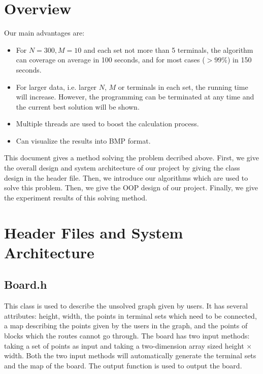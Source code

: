 \documentclass[12pt, a4paper]{article}
\begin{document}
	\section{Overview}
	
		Our main advantages are:
		
		\begin{itemize}
		
		\item For $N = 300, M = 10$ and each set not more than 5 terminals, the algorithm can coverage on average in 100 seconds, and for most cases ($> 99\%$) in 150 seconds.
		
		\item For larger data, i.e. larger $N$, $M$ or terminals in each set, the running time will increase. However, the programming can be terminated at any time and the current best solution will be shown.
		
		\item Multiple threads are used to boost the calculation process.
		
		\item Can visualize the results into BMP format.
		
		\end{itemize}
	
		This document gives a method solving the problem decribed above. First, we give the overall design and system architecture of our project by giving the class design in the header file. Then, we introduce our algorithms which are used to solve this problem. Then, we give the OOP design of our project. Finally, we give the experiment results of this solving method.
	
	\section{Header Files and System Architecture}
	
		\subsection{Board.h}
		
			This class is used to describe the unsolved graph given by users. It has several attributes: height, width, the points in terminal sets which need to be connected, a map describing the points given by the users in the graph, and the points of blocks which the routes cannot go through. The board has two input methods: taking a set of points as input and taking a two-dimension array sized height $\times$ width. Both the two input methods will automatically generate the terminal sets and the map of the board. The output function is used to output the board.
		
\end{document}
